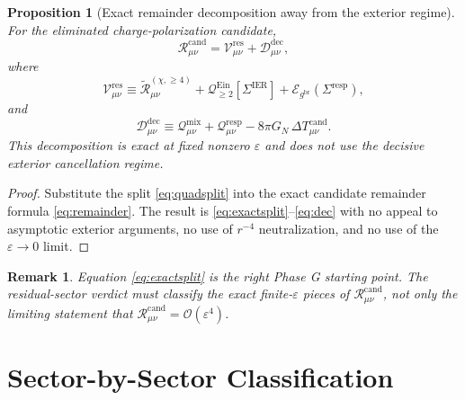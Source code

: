 \documentclass[11pt]{article}
\newcommand{\ObserverMetric}{g^{\mathrm{br}}}
\newcommand{\BaseShift}{\Sigma^{\mathrm{IER}}}
\newcommand{\ResponseShift}{\Sigma^{\mathrm{resp}}}
\newcommand{\ReLongFour}{\widetilde{\mathcal R}_{\mu\nu}^{(\chi,\ge 4)}}
\newcommand{\DeltaTCand}{\Delta T_{\mu\nu}^{\mathrm{cand}}}
\newcommand{\RemCand}{\mathcal R_{\mu\nu}^{\mathrm{cand}}}
\newcommand{\EinLin}{\mathcal E_{\ObserverMetric}}
\newcommand{\EinQuad}{\mathcal Q_{\ge 2}^{\mathrm{Ein}}}
\newcommand{\MixQuad}{\mathcal Q_{\mu\nu}^{\mathrm{mix}}}
\newcommand{\RespQuad}{\mathcal Q_{\mu\nu}^{\mathrm{resp}}}
\newcommand{\ResidualCore}{\mathcal V_{\mu\nu}^{\mathrm{res}}}
\newcommand{\ResidualDec}{\mathcal D_{\mu\nu}^{\mathrm{dec}}}
\newcommand{\epsIR}{\varepsilon}
\newtheorem{proposition}{Proposition}
\newtheorem{remark}{Remark}
\begin{document}
\begin{proposition}[Exact remainder decomposition away from the exterior regime]
\label{prop:exactsplit}
For the eliminated charge-polarization candidate,
\begin{equation}
\RemCand
=
\ResidualCore+\ResidualDec,
\label{eq:exactsplit}
\end{equation}
where
\begin{equation}
\ResidualCore
\equiv
\ReLongFour
+\EinQuad[\BaseShift]
+\EinLin(\ResponseShift),
\label{eq:core}
\end{equation}
and
\begin{equation}
\ResidualDec
\equiv
\MixQuad+\RespQuad-8\pi G_N\,\DeltaTCand.
\label{eq:dec}
\end{equation}
This decomposition is exact at fixed nonzero \(\epsIR\) and does not use the decisive exterior cancellation regime.
\end{proposition}

\begin{proof}
Substitute the split \eqref{eq:quadsplit} into the exact candidate remainder formula \eqref{eq:remainder}. The result is \eqref{eq:exactsplit}--\eqref{eq:dec} with no appeal to asymptotic exterior arguments, no use of \(r^{-4}\) neutralization, and no use of the \(\epsIR\to0\) limit.
\end{proof}

\begin{remark}
Equation \eqref{eq:exactsplit} is the right Phase G starting point. The residual-sector verdict must classify the exact finite-\(\epsIR\) pieces of \(\RemCand\), not only the limiting statement that \(\RemCand=\mathcal O(\epsIR^4)\).
\end{remark}

\section{Sector-by-Sector Classification}
\end{document}
